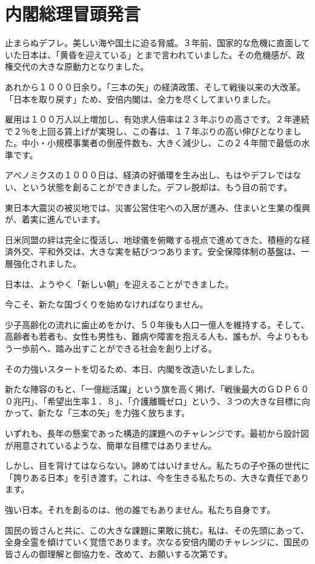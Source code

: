 \section {内閣総理冒頭発言}
止まらぬデフレ。美しい海や国土に迫る脅威。３年前、国家的な危機に直面していた日本は、「黄昏を迎えている」とまで言われていました。その危機感が、政権交代の大きな原動力となりました。\par
あれから１０００日余り。「三本の矢」の経済政策、そして戦後以来の大改革。「日本を取り戻す」ため、安倍内閣は、全力を尽くしてまいりました。\par
雇用は１００万人以上増加し、有効求人倍率は２３年ぶりの高さです。２年連続で２％を上回る賃上げが実現し、この春は、１７年ぶりの高い伸びとなりました。中小・小規模事業者の倒産件数も、大きく減少し、この２４年間で最低の水準です。\par
アベノミクスの１０００日は、経済の好循環を生み出し、もはやデフレではない、という状態を創ることができました。デフレ脱却は、もう目の前です。\par
東日本大震災の被災地では、災害公営住宅への入居が進み、住まいと生業の復興が、着実に進んでいます。\par
日米同盟の絆は完全に復活し、地球儀を俯瞰する視点で進めてきた、積極的な経済外交、平和外交は、大きな実を結びつつあります。安全保障体制の基盤は、一層強化されました。\par
日本は、ようやく「新しい朝」を迎えることができました。\par
今こそ、新たな国づくりを始めなければなりません。\par
少子高齢化の流れに歯止めをかけ、５０年後も人口一億人を維持する。そして、高齢者も若者も、女性も男性も、難病や障害を抱える人も、誰もが、今よりももう一歩前へ、踏み出すことができる社会を創り上げる。\par
その力強いスタートを切るため、本日、内閣を改造いたしました。\par
新たな陣容のもと、「一億総活躍」という旗を高く掲げ、「戦後最大のＧＤＰ６００兆円」、「希望出生率１．８」、「介護離職ゼロ」という、３つの大きな目標に向かって、新たな「三本の矢」を力強く放ちます。\par
いずれも、長年の懸案であった構造的課題へのチャレンジです。最初から設計図が用意されているような、簡単な目標ではありません。\par
しかし、目を背けてはならない。諦めてはいけません。私たちの子や孫の世代に「誇りある日本」を引き渡す。これは、今を生きる私たちの、大きな責任であります。\par
強い日本。それを創るのは、他の誰でもありません。私たち自身です。\par
国民の皆さんと共に、この大きな課題に果敢に挑む。私は、その先頭にあって、全身全霊を傾けていく覚悟であります。次なる安倍内閣のチャレンジに、国民の皆さんの御理解と御協力を、改めて、お願いする次第です。\par
\clearpage

